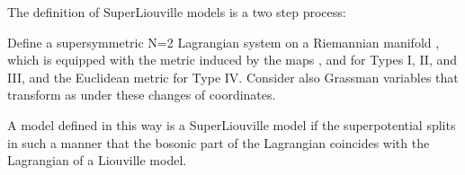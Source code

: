 \documentclass[a4paper,11pt,twoside]{article}
\def\r{\mathbb R}                   %
\begin{document}
\vspace{0.1cm}

The definition of SuperLiouville models is a two step process:

\coordHE{} Define a supersymmetric N=2 Lagrangian system on a
Riemannian manifold \coordHE{}, which is \myHighlight{$\r^2$}\coordHE{} equipped with the
metric induced by the maps \myHighlight{$\chi^*$}\coordHE{}, \myHighlight{$\zeta^*$}\coordHE{} and \myHighlight{$\gamma^*$}\coordHE{} for
Types I, II, and III, and the Euclidean metric for Type IV.
Consider also Grassman variables that transform as
\coordHE{}
under these changes of coordinates.

\coordHE{} A model defined in this way is a SuperLiouville model if the
superpotential splits in such a manner that the bosonic part of
the Lagrangian coincides with the Lagrangian of a Liouville model.

\vspace*{0.1cm}
\end{document}
